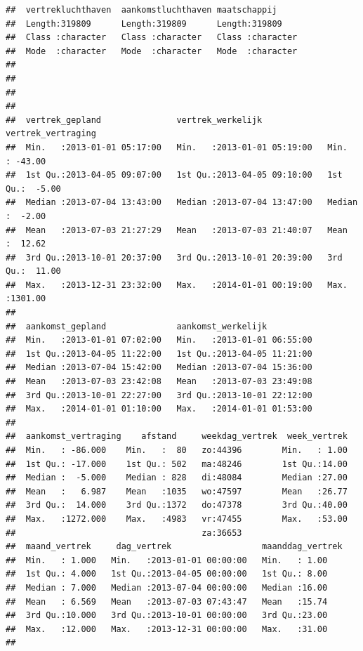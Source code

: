 \documentclass[]{tufte-book}
\begin{document}
\begin{verbatim}
##  vertrekluchthaven  aankomstluchthaven maatschappij      
##  Length:319809      Length:319809      Length:319809     
##  Class :character   Class :character   Class :character  
##  Mode  :character   Mode  :character   Mode  :character  
##                                                          
##                                                          
##                                                          
##                                                          
##  vertrek_gepland               vertrek_werkelijk             vertrek_vertraging
##  Min.   :2013-01-01 05:17:00   Min.   :2013-01-01 05:19:00   Min.   : -43.00   
##  1st Qu.:2013-04-05 09:07:00   1st Qu.:2013-04-05 09:10:00   1st Qu.:  -5.00   
##  Median :2013-07-04 13:43:00   Median :2013-07-04 13:47:00   Median :  -2.00   
##  Mean   :2013-07-03 21:27:29   Mean   :2013-07-03 21:40:07   Mean   :  12.62   
##  3rd Qu.:2013-10-01 20:37:00   3rd Qu.:2013-10-01 20:39:00   3rd Qu.:  11.00   
##  Max.   :2013-12-31 23:32:00   Max.   :2014-01-01 00:19:00   Max.   :1301.00   
##                                                                                
##  aankomst_gepland              aankomst_werkelijk           
##  Min.   :2013-01-01 07:02:00   Min.   :2013-01-01 06:55:00  
##  1st Qu.:2013-04-05 11:22:00   1st Qu.:2013-04-05 11:21:00  
##  Median :2013-07-04 15:42:00   Median :2013-07-04 15:36:00  
##  Mean   :2013-07-03 23:42:08   Mean   :2013-07-03 23:49:08  
##  3rd Qu.:2013-10-01 22:27:00   3rd Qu.:2013-10-01 22:12:00  
##  Max.   :2014-01-01 01:10:00   Max.   :2014-01-01 01:53:00  
##                                                             
##  aankomst_vertraging    afstand     weekdag_vertrek  week_vertrek  
##  Min.   : -86.000    Min.   :  80   zo:44396        Min.   : 1.00  
##  1st Qu.: -17.000    1st Qu.: 502   ma:48246        1st Qu.:14.00  
##  Median :  -5.000    Median : 828   di:48084        Median :27.00  
##  Mean   :   6.987    Mean   :1035   wo:47597        Mean   :26.77  
##  3rd Qu.:  14.000    3rd Qu.:1372   do:47378        3rd Qu.:40.00  
##  Max.   :1272.000    Max.   :4983   vr:47455        Max.   :53.00  
##                                     za:36653                       
##  maand_vertrek     dag_vertrek                  maanddag_vertrek
##  Min.   : 1.000   Min.   :2013-01-01 00:00:00   Min.   : 1.00   
##  1st Qu.: 4.000   1st Qu.:2013-04-05 00:00:00   1st Qu.: 8.00   
##  Median : 7.000   Median :2013-07-04 00:00:00   Median :16.00   
##  Mean   : 6.569   Mean   :2013-07-03 07:43:47   Mean   :15.74   
##  3rd Qu.:10.000   3rd Qu.:2013-10-01 00:00:00   3rd Qu.:23.00   
##  Max.   :12.000   Max.   :2013-12-31 00:00:00   Max.   :31.00   
## 
\end{verbatim}
\end{document}
